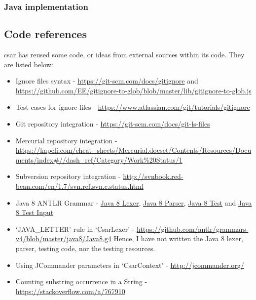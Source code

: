 \documentclass[12pt, letterpaper]{article}
\begin{document}
\subsubsection{Java implementation}

\subsection{Code references}
\label{sec:CodeReferences}
csar has reused some code, or ideas from external sources within its code. They are listed below:
\begin{itemize}
  \item Ignore files syntax - \url{https://git-scm.com/docs/gitignore} and \url{https://github.com/EE/gitignore-to-glob/blob/master/lib/gitignore-to-glob.js}
  \item Test cases for ignore files - \url{https://www.atlassian.com/git/tutorials/gitignore}
  \item Git repository integration - \url{https://git-scm.com/docs/git-ls-files}
  \item Mercurial repository integration - \url{https://kapeli.com/cheat_sheets/Mercurial.docset/Contents/Resources/Documents/index#//dash_ref/Category/Work%20Status/1}
  \item Subversion repository integration - \url{http://svnbook.red-bean.com/en/1.7/svn.ref.svn.c.status.html}
  \item Java 8 ANTLR Grammar - \href{https://github.com/antlr/grammars-v4/blob/02711067f82bed8e0c8dfd25e80f4f8ae2472abd/java8-pt/JavaLexer.g4}{Java 8 Lexer}, \href{https://github.com/antlr/grammars-v4/blob/02711067f82bed8e0c8dfd25e80f4f8ae2472abd/java8-pt/JavaParser.g4}{Java 8 Parser}, \href{https://github.com/antlr/grammars-v4/blob/02711067f82bed8e0c8dfd25e80f4f8ae2472abd/_grammar-test/src/test/java/TestJava8pt.java}{Java 8 Test} and \href{https://github.com/antlr/grammars-v4/blob/02711067f82bed8e0c8dfd25e80f4f8ae2472abd/java8-pt/examples/AllInOne8.java}{Java 8 Test Input}
  \item `JAVA\_LETTER' rule in `CsarLexer' - \url{https://github.com/antlr/grammars-v4/blob/master/java8/Java8.g4}
  Hence, I have not written the Java 8 lexer, parser, testing code, nor the testing resources.
  \item Using JCommander parameters in `CsarContext' - \url{http://jcommander.org/}
  \item Counting substring occurrence in a String - \url{https://stackoverflow.com/a/767910}
\end{itemize}
\end{document}
